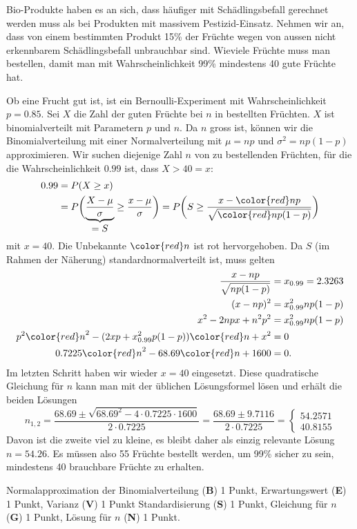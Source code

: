 Bio-Produkte haben es an sich, dass häufiger mit Schädlingsbefall gerechnet
werden muss als bei Produkten mit massivem Pestizid-Einsatz.
Nehmen wir an, dass von einem bestimmten Produkt 15\% der Früchte wegen von
aussen nicht erkennbarem Schädlingsbefall unbrauchbar sind.
Wieviele Früchte muss man bestellen, damit man mit Wahrscheinlichkeit 99\%
mindestens 40 gute Früchte hat.


\begin{loesung}
Ob eine Frucht gut ist, ist ein Bernoulli-Experiment mit Wahrscheinlichkeit
$p=0.85$.
Sei $X$ die Zahl der guten Früchte bei $n$ in bestellten Früchten.
$X$ ist binomialverteilt mit Parametern $p$ und $n$.
Da $n$ gross ist, können wir die Binomialverteilung mit einer
Normalverteilung mit $\mu=np$ und $\sigma^2=np(1-p)$ approximieren.
Wir suchen diejenige Zahl $n$ von zu bestellenden Früchten, für
die die Wahrscheinlichkeit $0.99$ ist, dass $X>40 =x$:
\begin{align*}
0.99
&=
P(X\ge x)\\
&=
P\biggl(\underbrace{\frac{X-\mu}{\sigma}}_{\displaystyle=S}\ge \frac{x-\mu}{\sigma}\biggr)
=
P\biggl(S\ge \frac{x-{\color{red}n}p}{\sqrt{{\color{red}n}p(1-p)}}\biggr)
\end{align*}
mit $x=40$.
Die Unbekannte $\color{red}n$ ist rot hervorgehoben.
Da $S$ (im Rahmen der Näherung) standardnormalverteilt ist, muss
gelten
\begin{align*}
\frac{x-np}{\sqrt{np(1-p)}}
&=
x_{0.99}=2.3263
\\
(x-np)^2
&=
x_{0.99}^2np(1-p)
\\
x^2-2npx+n^2p^2
&=
x_{0.99}^2np(1-p)
\\
p^2{\color{red}n}^2
-
(2xp+x_{0.99}^2p(1-p)) {\color{red}n}
+
x^2
&=0
\\
0.7225 {\color{red}n}^2 -68.69 {\color{red}n} + 1600
&= 
0.
\end{align*}
Im letzten Schritt haben wir wieder $x=40$ eingesetzt.
Diese quadratische Gleichung für $n$ kann man mit der üblichen
Lösungsformel lösen und erhält die beiden Lösungen
\[
n_{1,2}
=
\frac{68.69 \pm \sqrt{68.69^2-4\cdot 0.7225\cdot 1600}}{2\cdot 0.7225}
=
\frac{68.69 \pm 9.7116}{2\cdot 0.7225}
=
\begin{cases}
54.2571\\
40.8155
\end{cases}
\]
Davon ist die zweite viel zu kleine, es bleibt daher als einzig relevante
Lösung $n=54.26$.
Es müssen also 55 Früchte bestellt werden, um 99\% sicher zu sein,
mindestens 40 brauchbare Früchte zu erhalten.
\end{loesung}

\begin{bewertung}
Normalapproximation der Binomialverteilung ({\bf B}) 1 Punkt,
Erwartungswert ({\bf E}) 1 Punkt,
Varianz ({\bf V}) 1 Punkt
Standardisierung ({\bf S}) 1 Punkt,
Gleichung für $n$ ({\bf G}) 1 Punkt,
Lösung für $n$ ({\bf N}) 1 Punkt.
\end{bewertung}


